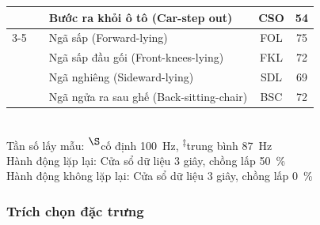 \begin{table}[t]
\begin{tabular}{lc||lcc}
         &  & \cellcolor{blue!20}Bước ra khỏi ô tô (Car-step out) & \cellcolor{blue!20}CSO & \cellcolor{blue!20}54\\\cline{3-5}
         
         &  & \cellcolor{blue!20}Ngã sấp (Forward-lying) & \cellcolor{blue!20}FOL & \cellcolor{blue!20}75\\
         
         &  & \cellcolor{blue!20}Ngã sấp đầu gối (Front-knees-lying) & \cellcolor{blue!20}FKL & \cellcolor{blue!20}72\\
         
         &  & \cellcolor{blue!20}Ngã nghiêng (Sideward-lying) & \cellcolor{blue!20}SDL & \cellcolor{blue!20}69\\
         
         &  & \cellcolor{blue!20}Ngã ngửa ra sau ghế (Back-sitting-chair) & \cellcolor{blue!20}BSC & \cellcolor{blue!20}72\\
         \hline\hline
    \end{tabular}
\vspace{0.2em}\\
\justifying\noindent Tần số lấy mẫu: \textsuperscript{$\S$}cố định 100~Hz, \textsuperscript{$\ddag$}trung bình 87~Hz
\vspace{0.2em}\\
\justifying\noindent \colorbox{pink!50}{\tiny\phantom{X}} Hành động lặp lại: Cửa sổ dữ liệu 3 giây, chồng lấp 50~\%
\vspace{0.2em}\\
\justifying\noindent \colorbox{blue!20}{\tiny\phantom{X}} Hành động không lặp lại: Cửa sổ dữ liệu 3 giây, chồng lấp 0~\%
\end{table}

\subsubsection{Trích chọn đặc trưng}

